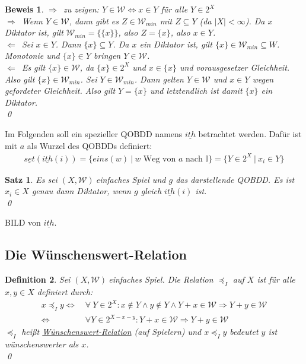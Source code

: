 \documentclass[ngerman]{scrartcl}
\theoremstyle{custom}
\newtheorem{mdef}{Definition} \numberwithin{mdef}{subsection}
\newtheorem{ms}[mdef]{Satz}
\newtheorem*{bw}{Beweis}
\newcommand{\0}{\mathbf{0}}
\newcommand{\1}{\mathbf{L}}
\newcommand{\set}{\underline{set}}
\newcommand{\sg}{$(X,\mathcal{W})~$}
\newcommand{\W}{\mathcal{W}}
\newcommand{\ith}{\underline{ith}}
\newcommand{\ww}{\preccurlyeq _{I}}
\begin{document}
\begin{bw}
\glqq $\Longrightarrow$\grqq ~zu zeigen: $Y \in \W \Leftrightarrow x \in Y$ f\"ur
alle $Y \in 2^X$\\
\glqq $\Rightarrow$\grqq~Wenn $Y \in \W$, dann gibt es $Z \in
\W_{min}$ mit $Z \subseteq Y$ (da $\vert X\vert < \infty$). Da $x$
Diktator ist, gilt $\W_{min} = \{\{x\}\}$, also $Z = \{x\}$, also $x
\in Y$.\\
\glqq $\Leftarrow$\grqq~Sei $x \in Y$. Dann $\{x\} \subseteq Y$. Da
$x$ ein Diktator ist, gilt $\{x\} \in \W_{min} \subseteq W$. Monotonie
und $\{x\} \in Y$ bringen $Y \in \W$.\\

\glqq $\Longleftarrow$\grqq~Es gilt $\{x\} \in \W$, da $\{x\} \in 2^X$ und
$x \in \{x\}$ und vorausgesetzer Gleichheit. Also gilt $\{x\} \in
\W_{min}$. Sei $Y \in \W_{min}$. Dann gelten $Y \in \W$ und $x \in Y$
wegen gefordeter Gleichheit. Also gilt $Y = \{x\}$ und letztendlich
ist damit $\{x\}$ ein Diktator.\\
\qed
\end{bw}

Im Folgenden soll ein spezieller QOBDD namens $\ith$ betrachtet
werden. Daf\"ur ist mit $a$ als Wurzel des
QOBDDs definiert:
\begin{align*}
\set(\ith(i)) = \{ eins(w) ~\vert~ w \text{ Weg von } a \text{ nach }
\mathds{I}\} = \{Y \in 2^X ~\vert~ x_i \in Y\}
\end{align*}

\begin{ms}
Es sei \sg einfaches Spiel und $g$ das darstellende QOBDD. Es ist $x_i
\in X$ genau dann Diktator, wenn $g$ gleich $\ith(i)$ ist.\\
\qed
\end{ms}

BILD von $\ith$.

\subsection{Die W\"unschenswert-Relation}
\begin{mdef}
Sei \sg einfaches Spiel. Die Relation $\preccurlyeq _{I}$ auf $X$
ist f\"ur alle $x,y \in X$ definiert durch:
\begin{align*}
x \ww y \Leftrightarrow &~\forall~ Y \in 2^X: x \not \in Y \wedge y
\not \in Y \wedge Y+x \in \W \Rightarrow Y+y \in \W\\
\Leftrightarrow &~\forall Y \in 2^{X-x-y}: Y+x \in \W \Rightarrow Y+y
\in \W
\end{align*}
$\ww$ hei\ss t \underline{W\"unschenswert-Relation} (auf Spielern) und
$x \ww y$ bedeutet \glqq $y$ ist w\"unschenswerter als $x$\grqq.\\
\qed
\end{mdef}
\end{document}
